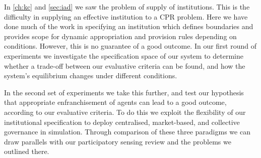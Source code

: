 In \autoref{ch:kc} and \autoref{sec:iad} we saw the problem of supply of
institutions. This is the difficulty in supplying an effective institution to
a \ac{CPR} problem. Here we have done much of the work in specifying an
institution which defines boundaries and provides scope for dynamic
appropriation and provision rules depending on conditions. However, this is no
guarantee of a good outcome. In our first round of experiments we investigate
the specification space of our system to determine whether a trade-off between
our evaluative criteria can be found, and how the system's equilibrium changes
under different conditions.

In the second set of experiments we take this further, and test our hypothesis
that appropriate enfranchisement of agents can lead to a good outcome,
according to our evaluative criteria. To do this we exploit the flexibility of
our institutional specification to deploy centralised, market-based, and
collective governance in simulation. Through comparison of these three
paradigms we can draw parallels with our participatory sensing review and the
problems we outlined there.




